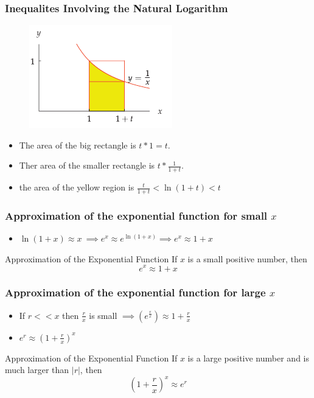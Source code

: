 \documentclass{beamer}
\begin{document}
\begin{frame}
  \frametitle{Inequalites Involving the Natural Logarithm} 
  \begin{figure}
    \centering
    \includegraphics[scale=0.5]{e_7.png}
  \end{figure}
  \begin{itemize}
    \item The area of the big rectangle is \( t * 1 = t \). 
    \item Ther area of the smaller rectangle is \( t * \frac{1}{1+t} \). 
    \item the area of the yellow region is \(   \frac{t}{1+t}  < \ln(1+t) < t \)
  \end{itemize}

\end{frame}

\begin{frame}
  \frametitle{Approximation of the exponential function for small \(x\)}
  \begin{itemize}
    \item \(\ln(1+x) \approx x\ \implies e^{x} \approx e^{\ln(1+x)}  \implies e^{x} \approx 1 + x\)
  \end{itemize}
  \begin{block}{Approximation of the Exponential Function}
    If \(x\) is a small positive number, then
    \[
      e^{x} \approx 1 + x
    \]
  \end{block}
\end{frame}

\begin{frame}
  \frametitle{Approximation of the exponential function for large \(x\)}
  \begin{itemize}
    \item If \(r << x\) then \(\frac{r}{x}\) is small \(\implies \left( e^{\frac{r}{x}}\right) \approx 1 + \frac{r}{x}\) 
    \item \(e^{r} \approx \left(1+\frac{r}{x}\right)^{x} \)
  \end{itemize}
  \begin{block}{Approximation of the Exponential Function}
    If \(x\) is a large positive number and is much larger than \(|r|\), then
    \[
      \left(1+\frac{r}{x}\right)^{x} \approx e^{r}
    \]
  \end{block}
\end{frame}
\end{document}
